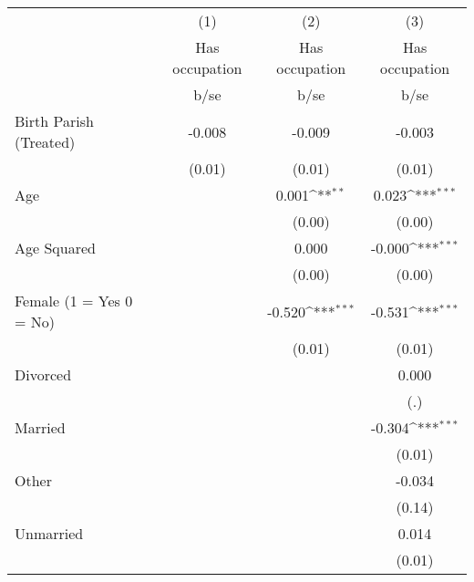 {
\def\sym#1{\ifmmode^{#1}\else\(^{#1}\)\fi}
\begin{tabular}{l*{3}{c}}
\hline\hline
                    &\multicolumn{1}{c}{(1)}&\multicolumn{1}{c}{(2)}&\multicolumn{1}{c}{(3)}\\
                    &\multicolumn{1}{c}{Has occupation}&\multicolumn{1}{c}{Has occupation}&\multicolumn{1}{c}{Has occupation}\\
                    &        b/se         &        b/se         &        b/se         \\
\hline
Birth Parish (Treated)&      -0.008         &      -0.009         &      -0.003         \\
                    &      (0.01)         &      (0.01)         &      (0.01)         \\
Age                 &                     &       0.001\sym{**} &       0.023\sym{***}\\
                    &                     &      (0.00)         &      (0.00)         \\
Age Squared         &                     &       0.000         &      -0.000\sym{***}\\
                    &                     &      (0.00)         &      (0.00)         \\
Female (1 = Yes 0 = No)&                     &      -0.520\sym{***}&      -0.531\sym{***}\\
                    &                     &      (0.01)         &      (0.01)         \\
Divorced            &                     &                     &       0.000         \\
                    &                     &                     &         (.)         \\
Married             &                     &                     &      -0.304\sym{***}\\
                    &                     &                     &      (0.01)         \\
Other               &                     &                     &      -0.034         \\
                    &                     &                     &      (0.14)         \\
Unmarried           &                     &                     &       0.014         \\
                    &                     &                     &      (0.01)         \\

\end{tabular}}

